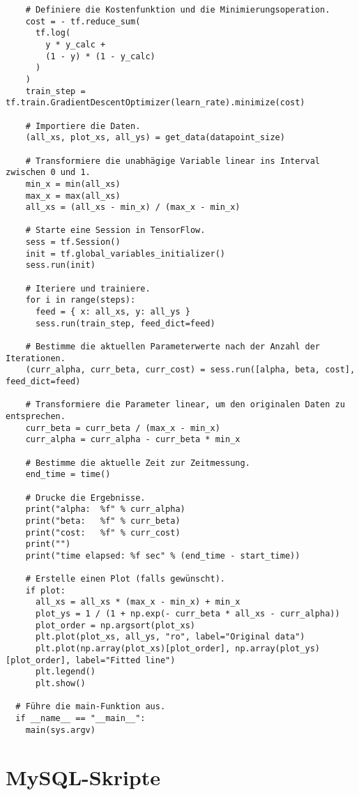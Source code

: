 \begin{verbatim}
    # Definiere die Kostenfunktion und die Minimierungsoperation.
    cost = - tf.reduce_sum(
      tf.log(
        y * y_calc +
        (1 - y) * (1 - y_calc)
      )
    )
    train_step = tf.train.GradientDescentOptimizer(learn_rate).minimize(cost)

    # Importiere die Daten.
    (all_xs, plot_xs, all_ys) = get_data(datapoint_size)

    # Transformiere die unabhägige Variable linear ins Interval zwischen 0 und 1.
    min_x = min(all_xs)
    max_x = max(all_xs)
    all_xs = (all_xs - min_x) / (max_x - min_x)

    # Starte eine Session in TensorFlow.
    sess = tf.Session()
    init = tf.global_variables_initializer()
    sess.run(init)

    # Iteriere und trainiere.
    for i in range(steps):
      feed = { x: all_xs, y: all_ys }
      sess.run(train_step, feed_dict=feed)

    # Bestimme die aktuellen Parameterwerte nach der Anzahl der Iterationen.
    (curr_alpha, curr_beta, curr_cost) = sess.run([alpha, beta, cost], feed_dict=feed)

    # Transformiere die Parameter linear, um den originalen Daten zu entsprechen.
    curr_beta = curr_beta / (max_x - min_x)
    curr_alpha = curr_alpha - curr_beta * min_x

    # Bestimme die aktuelle Zeit zur Zeitmessung.
    end_time = time()

    # Drucke die Ergebnisse.
    print("alpha:  %f" % curr_alpha)
    print("beta:   %f" % curr_beta)
    print("cost:   %f" % curr_cost)
    print("")
    print("time elapsed: %f sec" % (end_time - start_time))

    # Erstelle einen Plot (falls gewünscht).
    if plot:
      all_xs = all_xs * (max_x - min_x) + min_x
      plot_ys = 1 / (1 + np.exp(- curr_beta * all_xs - curr_alpha))
      plot_order = np.argsort(plot_xs)
      plt.plot(plot_xs, all_ys, "ro", label="Original data")
      plt.plot(np.array(plot_xs)[plot_order], np.array(plot_ys)[plot_order], label="Fitted line")
      plt.legend()
      plt.show()

  # Führe die main-Funktion aus.
  if __name__ == "__main__":
    main(sys.argv)
\end{verbatim}

\chapter{MySQL-Skripte}
\label{appendix:D}

